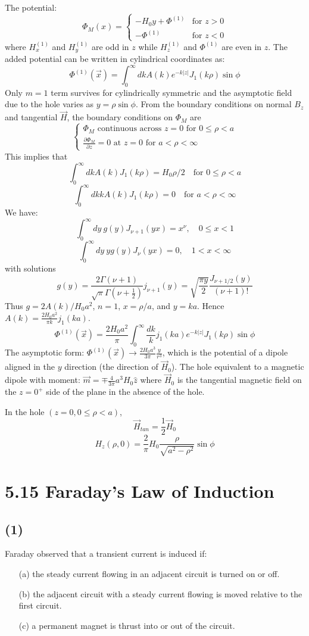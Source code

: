 \documentclass{article}
\begin{document}
	The potential:
	$$ \Phi_M(x) = \begin{cases} -H_0 y + \Phi^{(1)} & \text{for } z>0 \\ -\Phi^{(1)} & \text{for } z<0 \end{cases} $$
	where $H_x^{(1)}$ and $H_y^{(1)}$ are odd in $z$ while $H_z^{(1)}$ and $\Phi^{(1)}$ are even in $z$.
	The added potential can be written in cylindrical coordinates as:
	$$ \Phi^{(1)}(\vec{x}) = \int_0^\infty dk A(k) e^{-k|z|} J_1(k\rho) \sin\phi $$
	Only $m=1$ term survives for cylindrically symmetric and the asymptotic field due to the hole varies as $y=\rho\sin\phi$.
	From the boundary conditions on normal $B_z$ and tangential $\vec{H}$, the boundary conditions on $\Phi_M$ are
	$$ \begin{cases} \Phi_M \text{ continuous across } z=0 \text{ for } 0 \le \rho < a \\ \frac{\partial \Phi_M}{\partial z} = 0 \text{ at } z=0 \text{ for } a < \rho < \infty \end{cases} $$
	This implies that
	$$ \int_0^\infty dk A(k) J_1(k\rho) = H_0 \rho / 2 \quad \text{for } 0 \le \rho < a $$
	$$ \int_0^\infty dk k A(k) J_1(k\rho) = 0 \quad \text{for } a < \rho < \infty $$
	We have:
	$$ \int_0^\infty dy \ g(y) J_{\nu+1}(yx) = x^\nu, \quad 0 \le x < 1 $$
	$$ \int_0^\infty dy \ y g(y) J_{\nu}(yx) = 0, \quad 1 < x < \infty $$
	with solutions
	$$ g(y) = \frac{2\Gamma(\nu+1)}{\sqrt{\pi}\Gamma(\nu+\frac{1}{2})} j_{\nu+1}(y) = \sqrt{\frac{\pi y}{2}} \frac{J_{\nu+1/2}(y)}{(\nu+1)!} $$
	Thus $g = 2A(k)/H_0 a^2$, $n=1$, $x=\rho/a$, and $y=ka$.
	Hence $A(k) = \frac{2H_0 a^2}{\pi k} j_1(ka)$.
	$$ \Phi^{(1)}(\vec{x}) = \frac{2H_0 a^2}{\pi} \int_0^\infty \frac{dk}{k} j_1(ka) e^{-k|z|} J_1(k\rho) \sin\phi $$
	The asymptotic form: $\Phi^{(1)}(\vec{x}) \to \frac{2H_0 a^3}{3\pi} \frac{y}{r^3}$, which is the potential of a dipole aligned in the $y$ direction (the direction of $\vec{H}_0$).
	The hole equivalent to a magnetic dipole with moment: $\vec{m} = \mp \frac{4}{3\pi} a^3 H_0 \hat{z}$ where $\vec{H}_0$ is the tangential magnetic field on the $z=0^+$ side of the plane in the absence of the hole.
	
	In the hole $(z=0, 0 \le \rho < a)$,
	$$ \vec{H}_{tan} = \frac{1}{2}\vec{H}_0 $$
	$$ H_z(\rho, 0) = \frac{2}{\pi} H_0 \frac{\rho}{\sqrt{a^2-\rho^2}} \sin\phi $$
	\section*{5.15 Faraday's Law of Induction}
	\subsection*{(1)}
	Faraday observed that a transient current is induced if:
	\begin{enumerate}
		\item[(a)] the steady current flowing in an adjacent circuit is turned on or off.
		\item[(b)] the adjacent circuit with a steady current flowing is moved relative to the first circuit.
		\item[(c)] a permanent magnet is thrust into or out of the circuit.
	\end{enumerate}
	
\end{document}
